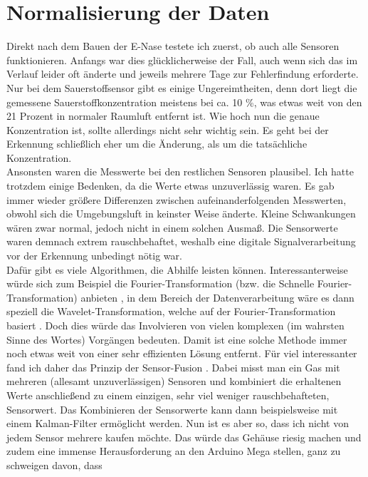 \documentclass[10pt]{article}
\begin{document}
\section{Normalisierung der Daten}
Direkt nach dem Bauen der E-Nase testete ich zuerst, ob auch alle Sensoren funktionieren. Anfangs war dies glücklicherweise der Fall, auch wenn sich 
das im Verlauf leider oft änderte und jeweils mehrere Tage zur Fehlerfindung erforderte. Nur bei dem Sauerstoffsensor gibt es einige Ungereimtheiten, denn dort
liegt die gemessene Sauerstoffkonzentration meistens bei ca. 10 \%, was etwas weit von den 21 Prozent in normaler Raumluft entfernt ist.
Wie hoch nun die genaue Konzentration ist, sollte allerdings nicht sehr wichtig sein. Es geht bei der Erkennung schließlich eher um die 
Änderung, als um die tatsächliche Konzentration.\\
Ansonsten waren die Messwerte bei den restlichen Sensoren plausibel. Ich hatte trotzdem einige Bedenken, da die Werte etwas unzuverlässig waren. Es gab immer wieder 
größere Differenzen zwischen aufeinanderfolgenden Messwerten, obwohl sich die Umgebungsluft in keinster Weise änderte. 
Kleine Schwankungen wären zwar normal, jedoch nicht in einem solchen Ausmaß. Die Sensorwerte waren demnach extrem rauschbehaftet,
weshalb eine digitale Signalverarbeitung vor der Erkennung unbedingt nötig war.\\
Dafür gibt es viele Algorithmen, die Abhilfe leisten können. Interessanterweise würde sich zum Beispiel die Fourier-Transformation 
(bzw. die Schnelle Fourier-Transformation) anbieten \autocite{FourierFiltering} \autocite{FourierConvolution}, 
in dem Bereich der Datenverarbeitung wäre es dann speziell die Wavelet-Transformation,
welche auf der Fourier-Transformation basiert \autocite{wavelet}. Doch dies würde das Involvieren von vielen komplexen (im wahrsten Sinne des Wortes) Vorgängen bedeuten.
Damit ist eine solche Methode immer noch etwas weit von einer sehr effizienten Lösung entfernt. Für viel interessanter fand ich daher das Prinzip der 
Sensor-Fusion \autocite{SensorFusionAndKalmanFilter}.
Dabei misst man ein Gas mit mehreren (allesamt unzuverlässigen) Sensoren und kombiniert die erhaltenen Werte anschließend zu einem einzigen, sehr viel weniger
rauschbehafteten, Sensorwert. Das Kombinieren der Sensorwerte kann dann beispielsweise mit einem Kalman-Filter \autocite{SensorFusionAndKalmanFilter} ermöglicht werden. Nun ist es aber so, dass
ich nicht von jedem Sensor mehrere kaufen möchte. Das würde das Gehäuse riesig machen und zudem eine immense Herausforderung an den Arduino Mega stellen, ganz zu schweigen davon, dass
\end{document}
